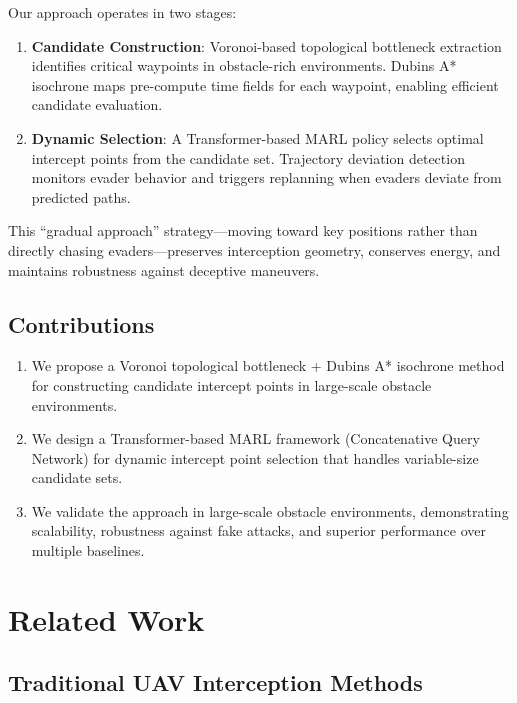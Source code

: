 \documentclass[10pt,conference]{IEEEtran}
\begin{document}
Our approach operates in two stages:
\begin{enumerate}
    \item \textbf{Candidate Construction}: Voronoi-based topological bottleneck extraction identifies critical waypoints in obstacle-rich environments. Dubins A* isochrone maps pre-compute time fields for each waypoint, enabling efficient candidate evaluation.
    \item \textbf{Dynamic Selection}: A Transformer-based MARL policy selects optimal intercept points from the candidate set. Trajectory deviation detection monitors evader behavior and triggers replanning when evaders deviate from predicted paths.
\end{enumerate}

This ``gradual approach'' strategy---moving toward key positions rather than directly chasing evaders---preserves interception geometry, conserves energy, and maintains robustness against deceptive maneuvers.

\subsection{Contributions}

\begin{enumerate}
    \item We propose a Voronoi topological bottleneck + Dubins A* isochrone method for constructing candidate intercept points in large-scale obstacle environments.
    \item We design a Transformer-based MARL framework (Concatenative Query Network) for dynamic intercept point selection that handles variable-size candidate sets.
    \item We validate the approach in large-scale obstacle environments, demonstrating scalability, robustness against fake attacks, and superior performance over multiple baselines.
\end{enumerate}

\section{Related Work}

\subsection{Traditional UAV Interception Methods}
\end{document}
